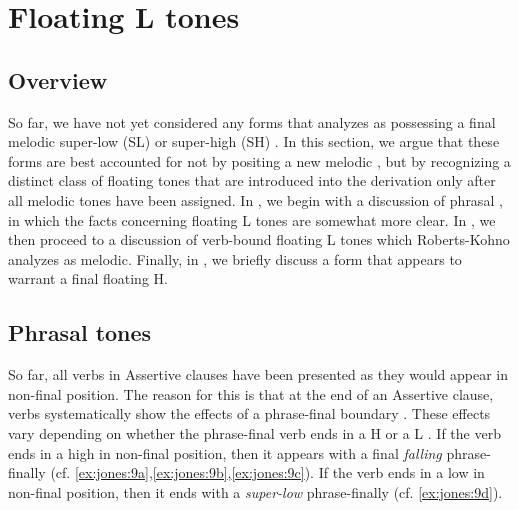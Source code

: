 \documentclass[output=paper,newtxmath,modfonts,nonflat,hidelinks]{langsci/langscibook}
\begin{document}
\section{Floating L tones}\label{sec:jones:4}
\subsection{Overview}\label{sec:jones:4.1}

So far, we have not yet considered any forms that \citet{Roberts-Kohno2014} analyzes as possessing a final melodic super-low (SL) or super-high (SH) . In this section, we argue that these forms are best accounted for not by positing a new melodic , but by recognizing a distinct class of floating tones that are introduced into the derivation only after all melodic tones have been assigned. In , we begin with a discussion of phrasal , in which the facts concerning floating L tones are somewhat more clear. In , we then proceed to a discussion of verb-bound floating L tones which Roberts-Kohno analyzes as melodic. Finally, in , we briefly discuss a form that appears to warrant a final floating H.

\subsection{Phrasal tones}\label{sec:jones:4.2}

So far, all verbs in Assertive clauses have been presented as they would appear in non-final position. The reason for this is that at the end of an Assertive clause, verbs systematically show the effects of a phrase-final boundary . These effects vary depending on whether the phrase-final verb ends in a H  or a L . If the verb ends in a high  in non-final position, then it appears with a final \textit{falling}  phrase-finally (cf. \ref{ex:jones:9a},\ref{ex:jones:9b},\ref{ex:jones:9c}). If the verb ends in a low  in non-final position, then it ends with a \textit{super-low}  phrase-finally (cf. \ref{ex:jones:9d}).
\end{document}
